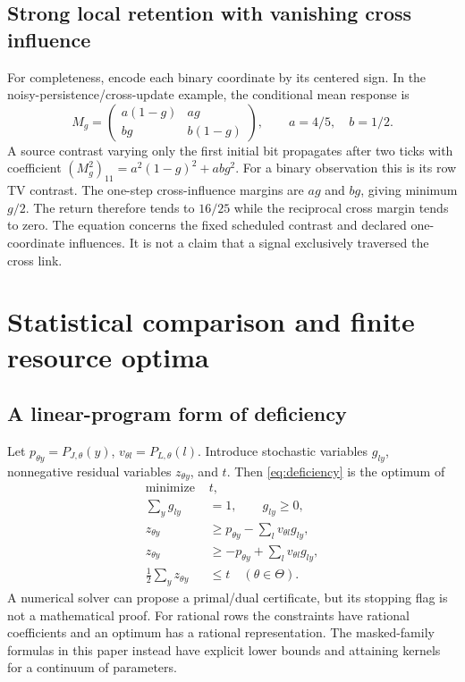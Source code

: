 \subsection{Strong local retention with vanishing cross influence}
For completeness, encode each binary coordinate by its centered sign. In the noisy-persistence/cross-update example, the conditional mean response is
\[
 M_g=\begin{pmatrix}a(1-g)&ag\\bg&b(1-g)\end{pmatrix},
 \qquad a=4/5,\quad b=1/2.
\]
A source contrast varying only the first initial bit propagates after two ticks with coefficient
\((M_g^2)_{11}=a^2(1-g)^2+abg^2\). For a binary observation this is its row TV contrast. The one-step cross-influence margins are \(ag\) and \(bg\), giving minimum \(g/2\). The return therefore tends to \(16/25\) while the reciprocal cross margin tends to zero. The equation concerns the fixed scheduled contrast and declared one-coordinate influences. It is not a claim that a signal exclusively traversed the cross link.



\section{Statistical comparison and finite resource optima}\label{app:statistical}
\subsection{A linear-program form of deficiency}
Let \(p_{\theta y}=P_{J,\theta}(y)\), \(v_{\theta l}=P_{L,\theta}(l)\). Introduce stochastic variables \(g_{ly}\), nonnegative residual variables \(z_{\theta y}\), and \(t\). Then \cref{eq:deficiency} is the optimum of
\begin{align*}
 \text{minimize }&t,\\
 \sum_y g_{ly}&=1,\qquad g_{ly}\ge0,\\
 z_{\theta y}&\ge p_{\theta y}-\sum_l v_{\theta l}g_{ly},\\
 z_{\theta y}&\ge -p_{\theta y}+\sum_l v_{\theta l}g_{ly},\\
 \tfrac12\sum_y z_{\theta y}&\le t \quad(\theta\in\Theta).
\end{align*}
A numerical solver can propose a primal/dual certificate, but its stopping flag is not a mathematical proof. For rational rows the constraints have rational coefficients and an optimum has a rational representation. The masked-family formulas in this paper instead have explicit lower bounds and attaining kernels for a continuum of parameters.

